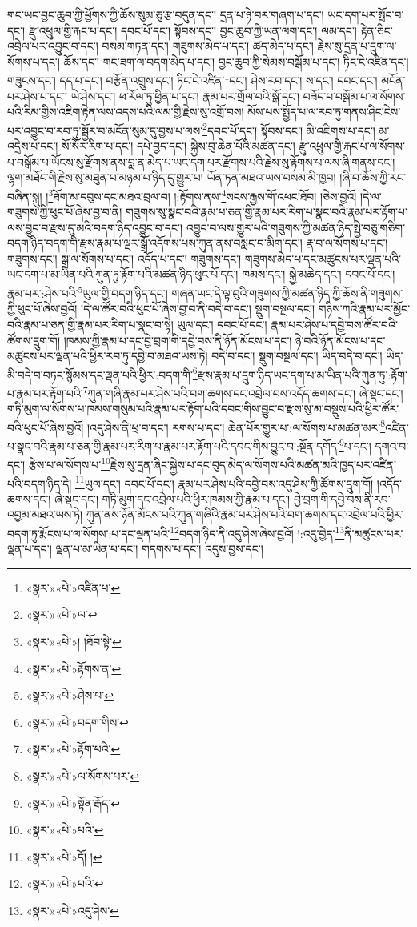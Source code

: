 གང་ཡང་བྱང་ཆུབ་ཀྱི་ཕྱོགས་ཀྱི་ཆོས་སུམ་ཅུ་རྩ་བདུན་དང་། དྲན་པ་ཉེ་བར་གཞག་པ་དང་། ཡང་དག་པར་སྤོང་བ་དང་། རྫུ་འཕྲུལ་གྱི་རྐང་པ་དང་། དབང་པོ་དང་། སྟོབས་དང་། བྱང་ཆུབ་ཀྱི་ཡན་ལག་དང་། ལམ་དང་། རྟེན་ཅིང་འབྲེལ་པར་འབྱུང་བ་དང་། བསམ་གཏན་དང་། གཟུགས་མེད་པ་དང་། ཚད་མེད་པ་དང་། རྗེས་སུ་དྲན་པ་དྲུག་ལ་སོགས་པ་དང་། ཆོས་དང་། གང་ཟག་ལ་བདག་མེད་པ་དང་། བྱང་ཆུབ་ཀྱི་སེམས་བསྒོམ་པ་དང་། ཏིང་ངེ་འཛིན་དང་། གཟུངས་དང་། དད་པ་དང་། བརྩོན་འགྲུས་དང་། ཏིང་ངེ་འཛིན་\footnote{«སྣར་»«པེ་»འཛིན་པ་}དང་། ཤེས་རབ་དང་། ས་དང་། དབང་དང་། མངོན་པར་ཤེས་པ་དང་། ཡེ་ཤེས་དང་། ཕ་རོལ་ཏུ་ཕྱིན་པ་དང་། རྣམ་པར་གྲོལ་བའི་སྒོ་དང་། བཟོད་པ་བསྒོམ་པ་ལ་སོགས་པའི་རིམ་གྱིས་འཇིག་རྟེན་ལས་འདས་པའི་ལམ་གྱི་རྗེས་སུ་འགྲོ་བས། མོས་པས་སྤྱོད་པ་ལ་རབ་ཏུ་གནས་ཤིང་ངེས་པར་འབྱུང་བ་རབ་ཏུ་སྦྱོར་བ་མངོན་སུམ་དུ་བྱས་པ་ལས་\footnote{«སྣར་»«པེ་»ལ་}དབང་པོ་དང་། སྟོབས་དང་། མི་འཇིགས་པ་དང་། མ་འདྲེས་པ་དང་། སོ་སོར་རིག་པ་དང་། དཔེ་བྱད་དང་། སྐྱེས་བུ་ཆེན་པོའི་མཚན་དང་། རྫུ་འཕྲུལ་གྱི་རྐང་པ་ལ་སོགས་པ་བསྒོམ་པ་ཡོངས་སུ་རྫོགས་ནས་བླ་ན་མེད་པ་ཡང་དག་པར་རྫོགས་པའི་རྗེས་སུ་རྟོགས་པ་ལས་ཞི་གནས་དང་། ལྷག་མཐོང་གི་རྗེས་སུ་མཐུན་པ་མཉམ་པ་ཉིད་དུ་གྱུར་པ། ཡོན་ཏན་མཐའ་ཡས་བསམ་མི་ཁྱབ། །ཞི་བ་ཆོས་ཀྱི་རང་བཞིན་སྐུ། །\footnote{«སྣར་»«པེ་»། །ཐོབ་སྟེ་}ཐོག་མ་དབུས་དང་མཐའ་བྲལ་བ། །:རྟོགས་ནས་\footnote{«སྣར་»«པེ་»རྟོགས་ན་}སངས་རྒྱས་གོ་འཕང་ཐོབ། །ཅེས་བྱའོ། །དེ་ལ་གཟུགས་ཀྱི་ཕུང་པོ་ཞེས་བྱ་བ་ནི། གཟུགས་སུ་སྣང་བའི་རྣམ་པ་ཅན་གྱི་རྣམ་པར་རིག་པ་སྣང་བའི་རྣམ་པར་རྟོག་པ་ལས་བྱུང་བ་རྫས་དུ་མའི་བདག་ཉིད་འབྱུང་བ་དང་། འབྱུང་བ་ལས་གྱུར་པའི་གཟུགས་ཀྱི་མཚན་ཉིད་སྤྱི་བཅུ་གཅིག་བདག་ཉིད་བདག་གི་རྫས་རྣམ་པ་ལྔར་སྒྲོ་འདོགས་པས་ཀུན་ནས་བསླང་བ་མིག་དང་། རྣ་བ་ལ་སོགས་པ་དང་། གཟུགས་དང་། སྒྲ་ལ་སོགས་པ་དང་། འདོད་པ་དང་། གཟུགས་དང་། གཟུགས་མེད་པ་དང་མཚུངས་པར་ལྡན་པའི་ཡང་དག་པ་མ་ཡིན་པའི་ཀུན་ཏུ་རྟོག་པའི་མཚན་ཉིད་ཕུང་པོ་དང་། ཁམས་དང་། སྐྱེ་མཆེད་དང་། དབང་པོ་དང་། རྣམ་པར་:ཤེས་པའི་\footnote{«སྣར་»«པེ་»ཤེས་པ་}ཡུལ་གྱི་བདག་ཉིད་དང་། གཞན་ཡང་དེ་ལྟ་བུའི་གཟུགས་ཀྱི་མཚན་ཉིད་ཀྱི་ཆོས་ནི་གཟུགས་ཀྱི་ཕུང་པོ་ཞེས་བྱའོ། །དེ་ལ་ཚོར་བའི་ཕུང་པོ་ཞེས་བྱ་བ་ནི་བདེ་བ་དང་། སྡུག་བསྔལ་དང་། གཉིས་ཀའི་རྣམ་པར་མྱོང་བའི་རྣམ་པ་ཅན་གྱི་རྣམ་པར་རིག་པ་སྣང་བ་སྟེ། ཡུལ་དང་། དབང་པོ་དང་། རྣམ་པར་ཤེས་པ་དབྱེ་བས་ཚོར་བའི་ཚོགས་དྲུག་གོ། །ཁམས་ཀྱི་རྣམ་པ་དང་བྱེ་བྲག་གི་དབྱེ་བས་ནི་ཉོན་མོངས་པ་དང་། ཉེ་བའི་ཉོན་མོངས་པ་དང་མཚུངས་པར་ལྡན་པའི་ཕྱིར་རབ་ཏུ་དབྱེ་བ་མཐའ་ཡས་ཏེ། བདེ་བ་དང་། སྡུག་བསྔལ་དང་། ཡིད་བདེ་བ་དང་། ཡིད་མི་བདེ་བ་བཏང་སྙོམས་དང་ལྡན་པའི་ཕྱིར་:བདག་གི་\footnote{«སྣར་»«པེ་»བདག་གིས་}རྫས་རྣམ་པ་དྲུག་ཉིད་ཡང་དག་པ་མ་ཡིན་པའི་ཀུན་ཏུ་:རྟོག་པ་རྣམ་པར་རྟོག་པའི་\footnote{«སྣར་»«པེ་»རྟོག་པའི་}ཀུན་གཞི་རྣམ་པར་ཤེས་པའི་བག་ཆགས་དང་འབྲེལ་བས་འདོད་ཆགས་དང་། ཞེ་སྡང་དང་། གཏི་མུག་ལ་སོགས་པ་ཁམས་གསུམ་པའི་རྣམ་པར་རྟོག་པའི་དབང་གིས་བྱུང་བ་རྫས་སུ་མ་བསྡུས་པའི་ཕྱིར་ཚོར་བའི་ཕུང་པོ་ཞེས་བྱའོ། །འདུ་ཤེས་ནི་ཕྲ་བ་དང་། རགས་པ་དང་། ཆེན་པོར་གྱུར་པ་:ལ་སོགས་པ་མཚན་མར་\footnote{«སྣར་»«པེ་»ལ་སོགས་པར་}འཛིན་པ་སྣང་བའི་རྣམ་པ་ཅན་གྱི་རྣམ་པར་རིག་པ་རྣམ་པར་རྟོག་པའི་དབང་གིས་བྱུང་བ་:སྔོན་དགོད་\footnote{«སྣར་»«པེ་»སྟོན་རྒོད་}པ་དང་། དགའ་བ་དང་། རྩེས་པ་ལ་སོགས་པ་\footnote{«སྣར་»«པེ་»པའི་}རྗེས་སུ་དྲན་ཞིང་སྐྱེས་པ་དང་བུད་མེད་ལ་སོགས་པའི་མཚན་མའི་ཁྱད་པར་འཛིན་པའི་བདག་ཉིད་དེ། \footnote{«སྣར་»«པེ་»དོ། ། }ཡུལ་དང་། དབང་པོ་དང་། རྣམ་པར་ཤེས་པའི་དབྱེ་བས་འདུ་ཤེས་ཀྱི་ཚོགས་དྲུག་གོ། །འདོད་ཆགས་དང་། ཞེ་སྡང་དང་། གཏི་མུག་དང་འབྲེལ་པའི་ཕྱིར་ཁམས་ཀྱི་རྣམ་པ་དང་། བྱེ་བྲག་གི་དབྱེ་བས་ནི་རབ་འབྱམ་མཐའ་ཡས་ཏེ། ཀུན་ནས་ཉོན་མོངས་པའི་ཀུན་གཞིའི་རྣམ་པར་ཤེས་པའི་བག་ཆགས་དང་འབྲེལ་པའི་ཕྱིར་བདག་ཏུ་རྨོངས་པ་ལ་སོགས་:པ་དང་ལྡན་པའི་\footnote{«སྣར་»«པེ་»པའི་}བདག་ཉིད་ནི་འདུ་ཤེས་ཞེས་བྱའོ། །:འདུ་བྱེད་\footnote{«སྣར་»«པེ་»འདུ་ཤེས་}ནི་མཚུངས་པར་ལྡན་པ་དང་། ལྡན་པ་མ་ཡིན་པ་དང་། གདགས་པ་དང་། འདུས་བྱས་དང་། 